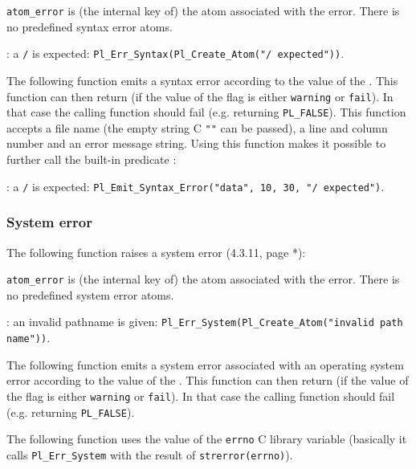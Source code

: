 \texttt{atom\_error} is (the internal key of) the atom associated with the
error. There is no predefined syntax error atoms.

: a \texttt{/} is expected:
\texttt{Pl\_Err\_Syntax(Pl\_Create\_Atom("/ expected"))}.

The following function emits a syntax error according to the value of the
  . This
function can then return (if the value of the flag is either
\texttt{warning} or \texttt{fail}). In that case the calling function should
fail (e.g. returning \texttt{PL\_FALSE}). This function accepts a file name (the
empty string C \texttt{""} can be passed), a line and column number and an
error message string. Using this function makes it possible to further call
the built-in predicate 
:


: a \texttt{/} is expected:
\texttt{Pl\_Emit\_Syntax\_Error("data", 10, 30, "/ expected")}.

\subsubsection{System error}
The following function raises a system error (4.3.11, page *):


\texttt{atom\_error} is (the internal key of) the atom associated with the
error. There is no predefined system error atoms.

: an invalid pathname is given:
\texttt{Pl\_Err\_System(Pl\_Create\_Atom("invalid path name"))}.

The following function emits a system error associated with an operating
system error according to the value of the 
 . This function can then return (if the value of the flag is either \texttt{warning} or \texttt{fail}).
In that case the calling function should fail (e.g. returning
\texttt{PL\_FALSE}).

The following function uses the value of the \texttt{errno} C library
variable (basically it calls \texttt{Pl\_Err\_System} with the result
of \texttt{strerror(errno)}).


